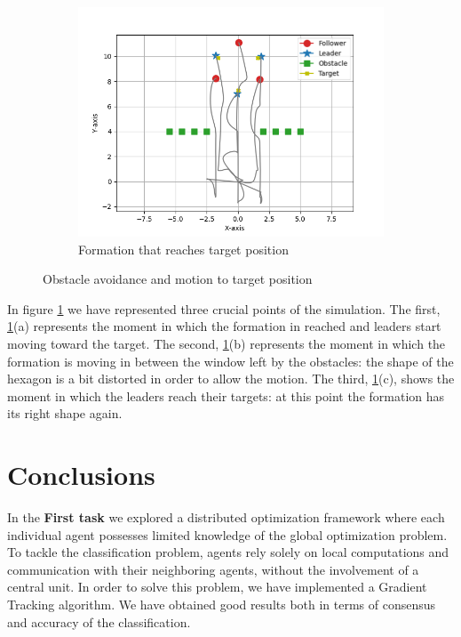 \documentclass[a4paper,11pt,oneside]{book}
\begin{document}
\begin{figure}[h]
\begin{subfigure}{0.5\textwidth}
	\includegraphics[width=\textwidth]{Hexagon_obstacle_target.jpg}
	\caption{Formation that reaches target position}
	\end{subfigure}
\caption{Obstacle avoidance and motion to target position}
\label{obstacle}
\end{figure}

In figure \ref{obstacle} we have represented three crucial points of the simulation. The first, \ref{obstacle}(a) represents the moment in which the formation in reached and leaders start moving toward the target. The second, \ref{obstacle}(b) represents the moment in which the formation is moving in between the window left by the obstacles: the shape of the hexagon is a bit distorted in order to allow the motion. The third, \ref{obstacle}(c), shows the moment in which the leaders reach their targets: at this point the formation has its right shape again.




\chapter*{Conclusions}
In the \textbf{First task} we explored a distributed optimization framework where each individual agent possesses limited knowledge of the global optimization problem. To tackle the classification problem, agents rely solely on local computations and communication with their neighboring agents, without the involvement of a central unit. In order to solve this problem, we have implemented a Gradient Tracking algorithm. 
We have obtained good results both in terms of consensus and accuracy of the classification. 
\end{document}
